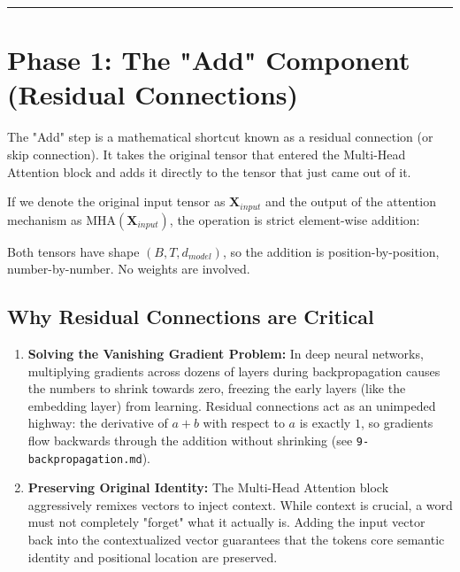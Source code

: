 \documentclass[11pt,a4paper,oneside]{report}
\providecommand{\tightlist}{\setlength{\itemsep}{0pt}\setlength{\parskip}{0pt}}
\begin{document}
\begin{center}\rule{0.5\linewidth}{0.5pt}\end{center}

\section{Phase 1: The "Add" Component (Residual Connections)}\label{phase-1-the-add-component-residual-connections}

The "Add" step is a mathematical shortcut known as a residual connection (or skip connection). It takes the original tensor that entered the Multi-Head Attention block and adds it directly to the tensor that just came out of it.

If we denote the original input tensor as \(\mathbf{X}_{input}\) and the output of the attention mechanism as \(\text{MHA}(\mathbf{X}_{input})\), the operation is strict element-wise addition:

\begin{center}\end{center}

Both tensors have shape \((B, T, d_{model})\), so the addition is position-by-position, number-by-number. No weights are involved.

\subsection{Why Residual Connections are Critical}\label{why-residual-connections-are-critical}

\begin{enumerate}
\def\labelenumi{\arabic{enumi}.}
\tightlist
\item
  \textbf{Solving the Vanishing Gradient Problem:} In deep neural networks, multiplying gradients across dozens of layers during backpropagation causes the numbers to shrink towards zero, freezing the early layers (like the embedding layer) from learning. Residual connections act as an unimpeded highway: the derivative of \(a + b\) with respect to \(a\) is exactly \(1\), so gradients flow backwards through the addition without shrinking (see \texttt{9-backpropagation.\allowbreak{}md}).
\item
  \textbf{Preserving Original Identity:} The Multi-Head Attention block aggressively remixes vectors to inject context. While context is crucial, a word must not completely "forget" what it actually is. Adding the input vector back into the contextualized vector guarantees that the token\textquotesingle s core semantic identity and positional location are preserved.
\end{enumerate}
\end{document}
